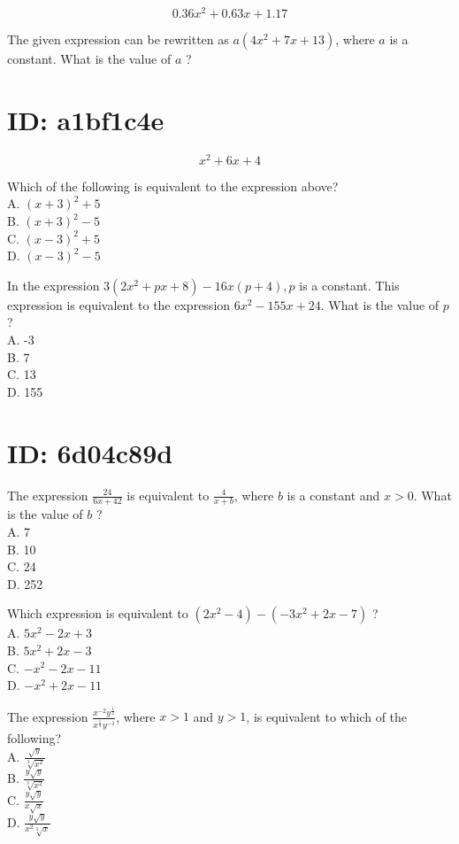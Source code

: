 $$
0.36 x^{2}+0.63 x+1.17
$$

The given expression can be rewritten as $a\left(4 x^{2}+7 x+13\right)$, where $a$ is a constant. What is the value of $a$ ?

\section*{ID: a1bf1c4e}
$$
x^{2}+6 x+4
$$

Which of the following is equivalent to the expression above?\\
A. $(x+3)^{2}+5$\\
B. $(x+3)^{2}-5$\\
C. $(x-3)^{2}+5$\\
D. $(x-3)^{2}-5$

In the expression $3\left(2 x^{2}+p x+8\right)-16 x(p+4), p$ is a constant. This expression is equivalent to the expression $6 x^{2}-155 x+24$. What is the value of $p$ ?\\
A. -3\\
B. 7\\
C. 13\\
D. 155

\section*{ID: 6d04c89d}
The expression $\frac{24}{6 x+42}$ is equivalent to $\frac{4}{x+b}$, where $b$ is a constant and $x>0$. What is the value of $b$ ?\\
A. 7\\
B. 10\\
C. 24\\
D. 252

Which expression is equivalent to $\left(2 x^{2}-4\right)-\left(-3 x^{2}+2 x-7\right)$ ?\\
A. $5 x^{2}-2 x+3$\\
B. $5 x^{2}+2 x-3$\\
C. $-x^{2}-2 x-11$\\
D. $-x^{2}+2 x-11$

The expression $\frac{x^{-2} y^{\frac{1}{2}}}{x^{\frac{1}{3}} y^{-1}}$, where $x>1$ and $y>1$, is equivalent to which of the following?\\
A. $\frac{\sqrt{y}}{\sqrt[3]{x^{2}}}$\\
B. $\frac{y \sqrt{y}}{\sqrt[3]{x^{2}}}$\\
C. $\frac{y \sqrt{y}}{x \sqrt{x}}$\\
D. $\frac{y \sqrt{y}}{x^{2} \sqrt[3]{x}}$

